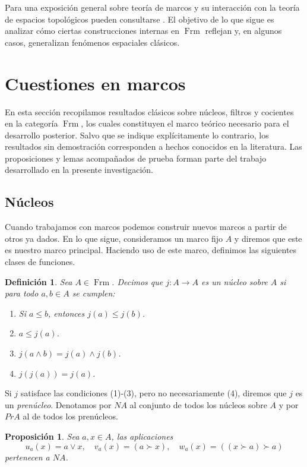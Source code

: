 \documentclass[12pt]{article}
\newtheorem{dfn}[thm]{Definición}
\newtheorem{prop}[thm]{Proposición}
\DeclareMathOperator{\Frm}{Frm}
\begin{document}
Para una exposición general sobre teoría de marcos y su interacción con la teoría de espacios topológicos
pueden consultarse \cite{Johnstone82,PicadoPultr,picado2021separation}. El objetivo de lo que sigue es analizar cómo ciertas construcciones internas en $\Frm$
reflejan y, en algunos casos, generalizan fenómenos espaciales clásicos.

\section{Cuestiones en marcos}
En esta sección recopilamos resultados clásicos sobre núcleos, filtros y cocientes en la categoría $\Frm$, los cuales constituyen el 
marco teórico necesario para el desarrollo posterior. Salvo que se indique explícitamente lo contrario, los resultados sin demostración 
corresponden a hechos conocidos en la literatura. Las proposiciones y lemas acompañados de prueba forman parte del trabajo desarrollado 
en la presente investigación.

\subsection{Núcleos}
Cuando trabajamos con marcos podemos construir nuevos marcos a partir de otros ya dados. En lo que sigue, consideramos un marco fijo $A$
y diremos que este es nuestro marco principal. Haciendo uso de este marco, definimos las siguientes clases de funciones.

\begin{dfn}\label{nucleo}
Sea $A\in \Frm$. Decimos que $j\colon A\to A$ es un \emph{núcleo} sobre $A$ si para todo $a, b\in A$ se cumplen:
\begin{enumerate}
\item Si $a\leq b$, entonces $j(a)\leq j(b)$.
\item $a\leq j(a)$.
\item $j(a\wedge b)=j(a)\wedge j(b)$.
\item $j(j(a))=j(a)$.
\end{enumerate}
\end{dfn}
Si $j$ satisface las condiciones (1)-(3), pero no necesariamente (4), diremos que $j$ es un \emph{prenúcleo}. 
Denotamos por $NA$ al conjunto de todos los núcleos sobre $A$ y por $PrA$ al de todos los prenúcleos.\\

\begin{prop}\label{ejnucleos}
Sea $a, x\in A$, las aplicaciones 
\[
u_a(x)=a\vee x,\quad v_a(x)=(a\succ x), \quad w_a(x)=((x\succ a)\succ a)
\]
pertenecen a $NA$.
\end{prop}
\end{document}
